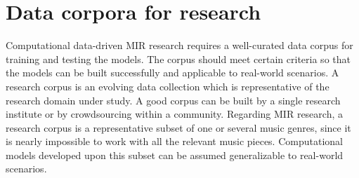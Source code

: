 \chapter{Data corpora for research}\label{chap:datasets}
%

Computational data-driven \gls{MIR} research requires a well-curated data corpus for training and testing the models. The corpus should meet certain criteria so that the models can be built successfully and applicable to real-world scenarios. A research corpus is an evolving data collection which is representative of the research domain under study. A good corpus can be built by a single research institute or by crowdsourcing within a community. Regarding \gls{MIR} research, a research corpus is a representative subset of one or several music genres, since it is nearly impossible to work with all the relevant music pieces. Computational models developed upon this subset can be assumed generalizable to real-world scenarios.

